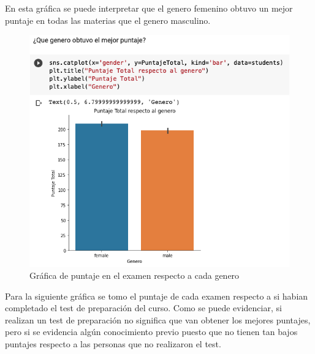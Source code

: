 \documentclass[conference,compsoc,onecolumn]{IEEEtran}
\begin{document}
        En esta gráfica se puede interpretar que el genero femenino obtuvo un mejor puntaje en todas las materias que el genero masculino.
         \begin{figure}[H]       
            \centering
            \includegraphics[scale = 0.50]{9.png}
            \caption{Gráfica de puntaje en el examen respecto a cada genero}
            \label{subfigura13}
        \end{figure}
        
        \par Para la siguiente gráfica se tomo el puntaje de cada examen respecto a si habian completado el test de preparación del curso. Como se puede evidenciar, si realizan un test de preparación no significa que van obtener los mejores puntajes, pero si se evidencia algún conocimiento previo puesto que no tienen tan bajos puntajes respecto a las personas que no realizaron el test.
        
\end{document}
